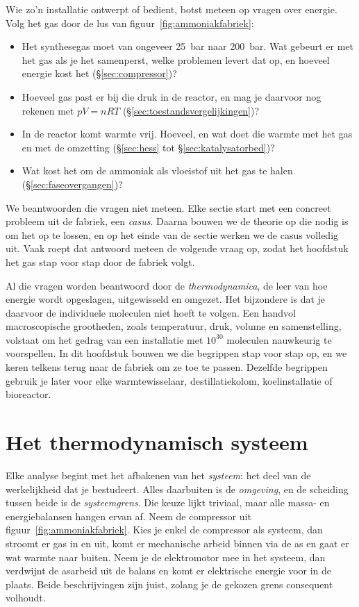 Wie zo'n installatie ontwerpt of bedient, botst meteen op vragen over energie. Volg het gas door de lus van figuur~\ref{fig:ammoniakfabriek}:
\begin{itemize}
\item Het synthesegas moet van ongeveer \SI{25}{\bar} naar \SI{200}{\bar}. Wat gebeurt er met het gas als je het samenperst, welke problemen levert dat op, en hoeveel energie kost het (\S\ref{sec:compressor})?
\item Hoeveel gas past er bij die druk in de reactor, en mag je daarvoor nog rekenen met $pV = nRT$ (\S\ref{sec:toestandsvergelijkingen})?
\item In de reactor komt warmte vrij. Hoeveel, en wat doet die warmte met het gas en met de omzetting (\S\ref{sec:hess} tot \S\ref{sec:katalysatorbed})?
\item Wat kost het om de ammoniak als vloeistof uit het gas te halen (\S\ref{sec:faseovergangen})?
\end{itemize}
We beantwoorden die vragen niet meteen. Elke sectie start met een concreet probleem uit de fabriek, een \emph{casus}. Daarna bouwen we de theorie op die nodig is om het op te lossen, en op het einde van de sectie werken we de casus volledig uit. Vaak roept dat antwoord meteen de volgende vraag op, zodat het hoofdstuk het gas stap voor stap door de fabriek volgt.

Al die vragen worden beantwoord door de \emph{thermodynamica}, de leer van hoe energie wordt opgeslagen, uitgewisseld en omgezet. Het bijzondere is dat je daarvoor de individuele moleculen niet hoeft te volgen. Een handvol macroscopische grootheden, zoals temperatuur, druk, volume en samenstelling, volstaat om het gedrag van een installatie met $10^{30}$ moleculen nauwkeurig te voorspellen. In dit hoofdstuk bouwen we die begrippen stap voor stap op, en we keren telkens terug naar de fabriek om ze toe te passen. Dezelfde begrippen gebruik je later voor elke warmtewisselaar, destillatiekolom, koelinstallatie of bioreactor.

\section{Het thermodynamisch systeem}
\label{sec:systeem}

Elke analyse begint met het afbakenen van het \emph{systeem}: het deel van de werkelijkheid dat je bestudeert. Alles daarbuiten is de \emph{omgeving}, en de scheiding tussen beide is de \emph{systeemgrens}. Die keuze lijkt triviaal, maar alle massa- en energiebalansen hangen ervan af. Neem de compressor uit figuur~\ref{fig:ammoniakfabriek}. Kies je enkel de compressor als systeem, dan stroomt er gas in en uit, komt er mechanische arbeid binnen via de as en gaat er wat warmte naar buiten. Neem je de elektromotor mee in het systeem, dan verdwijnt de asarbeid uit de balans en komt er elektrische energie voor in de plaats. Beide beschrijvingen zijn juist, zolang je de gekozen grens consequent volhoudt.

